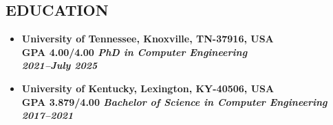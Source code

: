 \documentclass[line,margin,9pt]{res}
\begin{document}
\begin{resume}
\vspace{-10mm}

\section{EDUCATION}
\begin{itemize}
\item \bf{University of Tennessee, Knoxville}, TN-37916, USA\\
\bf GPA 4.00/4.00 \hfill \sl PhD in Computer Engineering\\
\textbf {2021--July 2025}

\item \bf{University of Kentucky}, Lexington, KY-40506, USA\\
\bf GPA 3.879/4.00 \hfill \sl Bachelor of Science in Computer Engineering\\
\textbf {2017--2021}



\end{itemize}




\end{resume}
\end{document}
